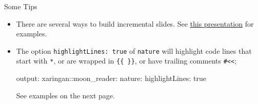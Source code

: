 \documentclass[ignorenonframetext,]{beamer}
\newenvironment{Shaded}{\begin{snugshade}}{\end{snugshade}}
\newcommand{\AttributeTok}[1]{\textcolor[rgb]{0.77,0.63,0.00}{#1}}
\newcommand{\FunctionTok}[1]{\textcolor[rgb]{0.00,0.00,0.00}{#1}}
\begin{document}
\begin{frame}[fragile]{Some Tips}
\protect\hypertarget{some-tips-3}{}

\begin{itemize}
\item
  There are several ways to build incremental slides. See
  \href{https://slides.yihui.name/xaringan/incremental.html}{this
  presentation} for examples.
\item
  The option \texttt{highlightLines:\ true} of \texttt{nature} will
  highlight code lines that start with \texttt{*}, or are wrapped in
  \texttt{\{\{\ \}\}}, or have trailing comments
  \texttt{\#\textless{}\textless{}};

\begin{Shaded}
\begin{Highlighting}[]
\FunctionTok{output:}
  \FunctionTok{xaringan:}\AttributeTok{:moon_reader:}
    \FunctionTok{nature:}
      \FunctionTok{highlightLines:}\AttributeTok{ true}
\end{Highlighting}
\end{Shaded}

  See examples on the next page.
\end{itemize}

\end{frame}
\end{document}
